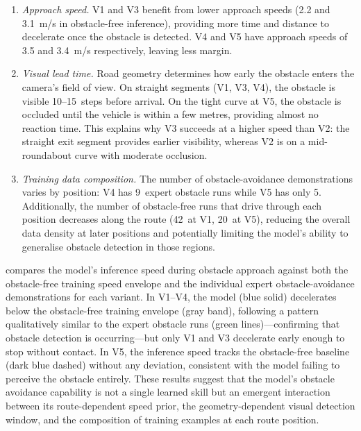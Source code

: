 \begin{enumerate}
  \item {\emph{Approach speed.} V1 and V3 benefit from lower approach speeds (2.2 and 3.1~m/s in obstacle-free inference), providing more time and distance to decelerate once the obstacle is detected. V4 and V5 have approach speeds of 3.5 and 3.4~m/s respectively, leaving less margin.}

  \item {\emph{Visual lead time.} Road geometry determines how early the obstacle enters the camera's field of view. On straight segments (V1, V3, V4), the obstacle is visible 10--15~steps before arrival. On the tight curve at V5, the obstacle is occluded until the vehicle is within a few metres, providing almost no reaction time. This explains why V3 succeeds at a higher speed than V2: the straight exit segment provides earlier visibility, whereas V2 is on a mid-roundabout curve with moderate occlusion.}

  \item {\emph{Training data composition.} The number of obstacle-avoidance demonstrations varies by position: V4 has 9~expert obstacle runs while V5 has only 5. Additionally, the number of obstacle-free runs that drive through each position decreases along the route (42~at V1, 20~at V5), reducing the overall data density at later positions and potentially limiting the model's ability to generalise obstacle detection in those regions.}
\end{enumerate}

 {compares the model's inference speed during obstacle approach against both the obstacle-free training speed envelope and the individual expert obstacle-avoidance demonstrations for each variant. In V1--V4, the model (blue solid) decelerates below the obstacle-free training envelope (gray band), following a pattern qualitatively similar to the expert obstacle runs (green lines)---confirming that obstacle detection is occurring---but only V1 and V3 decelerate early enough to stop without contact. In V5, the inference speed tracks the obstacle-free baseline (dark blue dashed) without any deviation, consistent with the model failing to perceive the obstacle entirely. These results suggest that the model's obstacle avoidance capability is not a single learned skill but an emergent interaction between its route-dependent speed prior, the geometry-dependent visual detection window, and the composition of training examples at each route position.}

